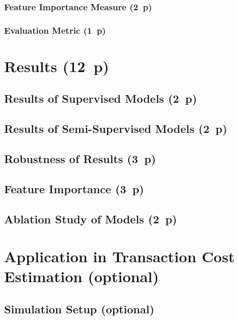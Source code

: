 \subsubsection{Feature Importance
  Measure (2~p)}\label{sec:feature-importance-measure}

\subsubsection{Evaluation Metric (1~p)}\label{sec:evaluation-metric}

\newpage
\section{Results (12~p)}\label{sec:results}

\subsection{Results of Supervised
  Models (2~p)}\label{sec:results-of-supervised-models}

\subsection{Results of Semi-Supervised
  Models (2~p)}\label{sec:results-of-semi-supervised-models}

\subsection{Robustness of Results (3~p)}\label{sec:robustness-checks} 
  
\subsection{Feature Importance (3~p)}\label{sec:feature-importance}

\subsection{Ablation Study of Models (2~p)}\label{sec:ablation-study}

\newpage
\section{Application in Transaction Cost Estimation (optional)}\label{sec:application}
\subsection{Simulation Setup (optional)}\label{sec:simulation-setup}
